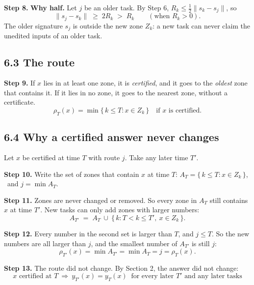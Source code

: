 \documentclass[11pt,a4paper]{article}
\newcommand{\step}[1]{\textbf{Step #1.}}
\begin{document}
\step{8} \textbf{Why half.} Let $j$ be an older task. By Step 6, $R_k \le \tfrac12\|s_k - s_j\|$, so
\[ \|s_j - s_k\| \;\ge\; 2R_k \;>\; R_k \qquad (\text{when } R_k > 0). \]
The older signature $s_j$ is outside the new zone $Z_k$: a new task can never claim the unedited
inputs of an older task.

\subsection*{6.3 The route}

\step{9} If $x$ lies in at least one zone, it is \emph{certified}, and it goes to the \emph{oldest} zone
that contains it. If it lies in no zone, it goes to the nearest zone, without a certificate.
\[ \rho_T(x) = \min\{\,k \le T : x \in Z_k\,\} \quad \text{if } x \text{ is certified.} \]

\begin{center}
\end{center}

\subsection*{6.4 Why a certified answer never changes}

Let $x$ be certified at time $T$ with route $j$. Take any later time $T'$.

\step{10} Write the set of zones that contain $x$ at time $T$:
\quad $A_T = \{\,k \le T : x \in Z_k\,\}$, \ and $j = \min A_T$.

\step{11} Zones are never changed or removed. So every zone in $A_T$ still contains $x$ at time $T'$.
New tasks can only add zones with larger numbers:
\[ A_{T'} \;=\; A_T \ \cup\ \{\,k : T < k \le T',\ x \in Z_k\,\}. \]

\step{12} Every number in the second set is larger than $T$, and $j \le T$. So the new numbers are all
larger than $j$, and the smallest number of $A_{T'}$ is still $j$:
\[ \rho_{T'}(x) = \min A_{T'} = \min A_T = j = \rho_T(x). \]

\step{13} The route did not change. By Section 2, the answer did not change:
\[ \boxed{\ x \text{ certified at } T \ \Longrightarrow\ y_{T'}(x) = y_T(x) \ \text{ for every later } T' \text{ and any later tasks}\ } \]
\end{document}
